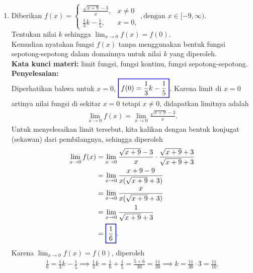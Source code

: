 \documentclass[10pt,openany,a4paper]{article}
\theoremstyle{definition}
\theoremstyle{definition}
\theoremstyle{plain}
\newenvironment{jawab}[2][tes]{
\textbf{Kata kunci materi:} #1.\\
\textbf{Penyelesaian:} #2
}{}
\begin{document}
\begin{enumerate}
\begin{jawab}[turunan fungsi, aturan rantai]
{\begin{align*}
        \end{align*}
    }
    \end{jawab}
    \item Diberikan $f(x)=\begin{cases}
        \frac{\sqrt{x+9}-3}{x}, &x\neq 0\\
        \frac{1}{3}k-\frac{1}{5}, &x=0,
    \end{cases}, \text{dengan } x\in [-9,\infty)$.\\
    Tentukan nilai $k$ sehingga $\displaystyle\lim_{x\to 0}f(x)=f(0)$.\\
    Kemudian nyatakan fungsi $f(x)$ tanpa menggunakan bentuk fungsi sepotong-sepotong dalam domainnya untuk nilai $k$ yang diperoleh.\\
    \begin{jawab}[limit fungsi, fungsi kontinu, fungsi sepotong-sepotong]{~~\\
            Diperhatikan bahwa untuk \(x = 0\), $\colorlet{oldcolor}{.}
        \color{blue}
        \setlength{\fboxrule}{1pt} \boxed{\color{oldcolor}f(0) = \frac{1}{3}k-\frac{1}{5}}\color{oldcolor}$. Karena limit di $x=0$ artinya nilai fungsi di sekitar $x=0$ tetapi $x\neq 0$, didapatkan limitnya adalah
            \begin{align*}
            \lim_{x \to 0} f(x) = \lim_{x \to 0} \frac{\sqrt{x+9}-3}{x}.
            \end{align*}
            Untuk menyelesaikan limit tersebut, kita kalikan dengan bentuk konjugat (sekawan) dari pembilangnya, sehingga diperoleh
            \begin{align*}
                \lim_{x\to 0} f(x)&=\lim_{x\to 0}\frac{\sqrt{x+9}-3}{x}\cdot\frac{\sqrt{x+9}+3}{\sqrt{x+9}+3}\\
                &=\lim_{x\to 0}\frac{x+9-9}{x(\sqrt{x+9}+3)}\\
                &=\lim_{x\to 0}\frac{x}{x(\sqrt{x+9}+3)}\\
                &=\lim_{x\to 0}\frac{1}{\sqrt{x+9}+3}\\
                &=\colorlet{oldcolor}{.}
        \color{blue}
        \setlength{\fboxrule}{1pt} \boxed{\color{oldcolor}\frac{1}{6}}\color{oldcolor}.
            \end{align*}
            Karena $\displaystyle\lim_{x \to 0} f(x) = f(0)$, diperoleh
            \begin{align*}
                \frac{1}{6} = \frac{1}{3}k-\frac{1}{5} \implies \frac{1}{3}k = \frac{1}{6} + \frac{1}{5} = \frac{5+6}{30} = \frac{11}{30} \implies k = \frac{11}{30} \cdot 3 = \frac{11}{10}.

\end{align*}}
\end{jawab}
\end{enumerate}
\end{document}

